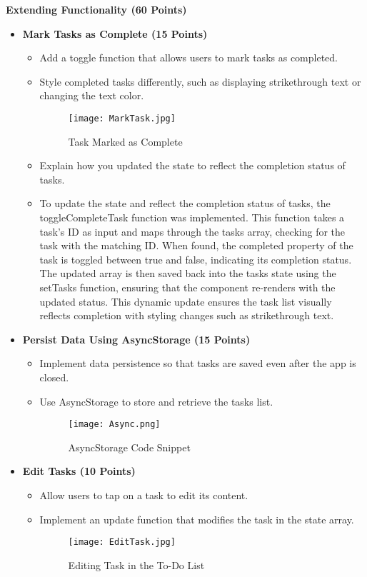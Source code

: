 \documentclass{article}
\begin{document}
\textbf{Extending Functionality (60 Points)}
\begin{itemize}
    \item \textbf{Mark Tasks as Complete (15 Points)}
    \begin{itemize}
        \item Add a toggle function that allows users to mark tasks as completed.
        \item Style completed tasks differently, such as displaying strikethrough text or changing the text color.
        \begin{figure}[H]
            \centering
            \texttt{[image: MarkTask.jpg]}
            \caption{Task Marked as Complete}
        \end{figure}
     
        \item Explain how you updated the state to reflect the completion status of tasks.
        \item To update the state and reflect the completion status of tasks, the toggleCompleteTask function was implemented. This function takes a task's ID as input and maps through the tasks array, checking for the task with the matching ID. When found, the completed property of the task is toggled between true and false, indicating its completion status. The updated array is then saved back into the tasks state using the setTasks function, ensuring that the component re-renders with the updated status. This dynamic update ensures the task list visually reflects completion with styling changes such as strikethrough text.
    \end{itemize}
    
    \item \textbf{Persist Data Using AsyncStorage (15 Points)}
    \begin{itemize}
        \item Implement data persistence so that tasks are saved even after the app is closed.
        \item Use AsyncStorage to store and retrieve the tasks list.
        \begin{figure}[H]
            \centering
            \texttt{[image: Async.png]}
            \caption{AsyncStorage Code Snippet}
        \end{figure}
    \end{itemize}
    
    \item \textbf{Edit Tasks (10 Points)}
    \begin{itemize}
        \item Allow users to tap on a task to edit its content.
        \item Implement an update function that modifies the task in the state array.
        \begin{figure}[H]
            \centering
            \texttt{[image: EditTask.jpg]}
            \caption{Editing Task in the To-Do List}
        \end{figure}


\end{itemize}
\end{itemize}
\end{document}
